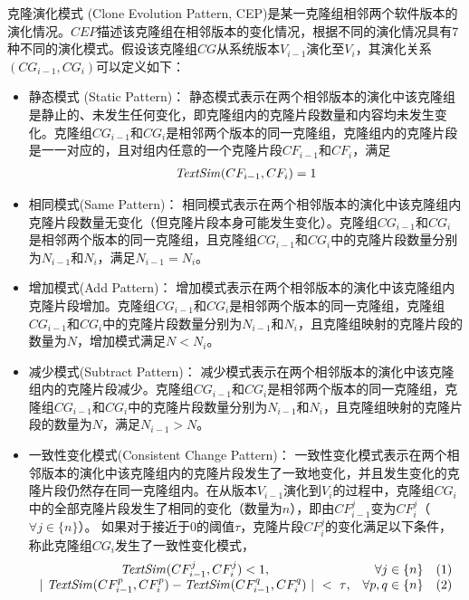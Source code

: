 \begin{definition}[克隆演化模式]
\label{def-evolutionpattern}
克隆演化模式 (Clone Evolution Pattern, CEP)是某一克隆组相邻两个软件版本的演化情况。$CEP$描述该克隆组在相邻版本的变化情况，根据不同的演化情况具有7种不同的演化模式。假设该克隆组$CG$从系统版本$V_{i-1}$演化至$V_{i}$，其演化关系$(CG_{i-1},CG_{i})$可以定义如下：
\begin{itemize}
\item 
静态模式 (Static Pattern)：
静态模式表示在两个相邻版本的演化中该克隆组是静止的、未发生任何变化，即克隆组内的克隆片段数量和内容均未发生变化。克隆组$CG_{i-1}$和$CG_{i}$是相邻两个版本的同一克隆组，克隆组内的克隆片段是一一对应的，且对组内任意的一个克隆片段$CF_{i-1}$和$CF_{i}$，满足
\begin{equation} 
\begin{array}[t]{c}
  \mathit{TextSim}(CF_{i-1}, CF_i) = 1 \\
\end{array}
\end{equation}

\item 
相同模式(Same Pattern)：
相同模式表示在两个相邻版本的演化中该克隆组内克隆片段数量无变化（但克隆片段本身可能发生变化）。克隆组$CG_{i-1}$和$CG_{i}$是相邻两个版本的同一克隆组，且克隆组$CG_{i-1}$和$CG_{i}$中的克隆片段数量分别为$N_{i-1}$和$N_{i}$，满足$N_{i-1} = N_{i}$。

\item 
增加模式(Add Pattern)：
增加模式表示在两个相邻版本的演化中该克隆组内克隆片段增加。克隆组$CG_{i-1}$和$CG_{i}$是相邻两个版本的同一克隆组，克隆组$CG_{i-1}$和$CG_{i}$中的克隆片段数量分别为$N_{i-1}$和$N_{i}$，且克隆组映射的克隆片段的数量为$N$，增加模式满足$N < N_{i}$。

\item 
减少模式(Subtract Pattern)：
减少模式表示在两个相邻版本的演化中该克隆组内的克隆片段减少。克隆组$CG_{i-1}$和$CG_{i}$是相邻两个版本的同一克隆组，克隆组$CG_{i-1}$和$CG_{i}$中的克隆片段数量分别为$N_{i-1}$和$N_{i}$，且克隆组映射的克隆片段的数量为$N$，满足$N_{i-1} > N$。

\item 
一致性变化模式(Consistent Change Pattern)： 
一致性变化模式表示在两个相邻版本的演化中该克隆组内的克隆片段发生了一致地变化，并且发生变化的克隆片段仍然存在同一克隆组内。在从版本$V_{i-1}$演化到$V_{i}$的过程中，克隆组$CG_{i}$中的全部克隆片段发生了相同的变化（数量为$n$），即由$CF^{j}_{i-1}$变为$CF^{j}_i$（$\forall j \in \{n\}$）。  如果对于接近于0的阈值$\tau$，克隆片段$CF^{j}_i$的变化满足以下条件，称此克隆组$CG_{i}$发生了一致性变化模式， 
\begin{equation}
\begin{split}
\begin{array}[t]{crl}
    \mathit{TextSim}(CF^{j}_{i-1}, CF^{j}_{i}) < 1, & \forall j \in \{n\} &(1)  \\
    {|~\mathit{TextSim}(CF^{p}_{i-1},CF^{p}_{i})-\mathit{TextSim}(CF^{q}_{i-1},CF^{q}_{i}) ~|~<~\tau},  & \forall {p,q} \in \{n\}& (2)
\end{array}
\end{split}
\end{equation}
  

\end{itemize}
\end{definition}
